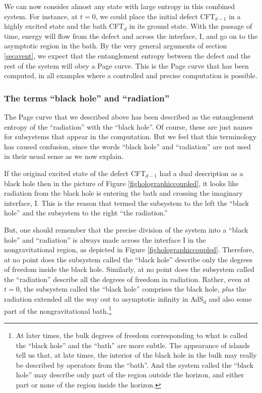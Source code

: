 \documentclass[12pt]{article}
\begin{document}
We can now consider almost any state with large entropy in this combined system. For instance, at $t = 0$,  we could place the initial defect CFT$_{d-1}$ in a highly excited state and the bath CFT$_d$ in its ground state. With the passage of time, energy will flow from the defect and across the interface, I, and go on to the asymptotic region in the bath.
 By the very general arguments of section \ref{secavent}, we expect that the entanglement entropy between the defect and the rest of the system will obey a Page curve. This is the Page curve that has been computed, in all examples where a
controlled and precise computation is possible.


\subsubsection{The terms ``black hole'' and ``radiation''}
The Page curve that we described above has been described as the entanglement entropy of the ``radiation'' with the ``black hole''. Of course, these are just names for subsystems that appear in the computation. But we feel that this terminology has caused confusion, since the words ``black hole'' and ``radiation'' are not used in their usual sense as we now explain.

If the original excited state of the defect CFT$_{d-1}$ had a dual description as a black hole then in the picture of Figure \ref{figholographiccoupled}, it looks like radiation from the black hole is entering the bath and crossing the imaginary interface, I.
 This is the reason that \cite{Almheiri:2019hni,Almheiri:2019yqk} termed the subsystem to the left the ``black hole'' and the subsystem to the right ``the radiation.''

But, one should remember that the precise division of the system into a ``black hole'' and ``radiation''  is always made across  the interface I in the nongravitational region, as depicted in Figure \ref{figholographiccoupled}. Therefore, at no point does the subsystem called the ``black hole'' describe only the degrees of freedom inside the black hole. Similarly, at no point does the subsystem called the ``radiation'' describe all the degrees of freedom in radiation.  Rather, even at $t = 0$, the subsystem called the ``black hole'' comprises the black hole,  {\em plus} the radiation extended all the way out to asymptotic infinity in AdS$_d$ and also some part of the nongravitational bath.\footnote{At later times, the bulk degrees of freedom corresponding to what is called the ``black hole'' and the ``bath'' are more subtle. The appearance of islands tell us that, at late times, the interior of the black hole in the bulk may really be described by operators from the ``bath''. And the system called the ``black hole'' may describe only part of the region outside the horizon, and either part or none of the region inside the horizon.}
\end{document}
